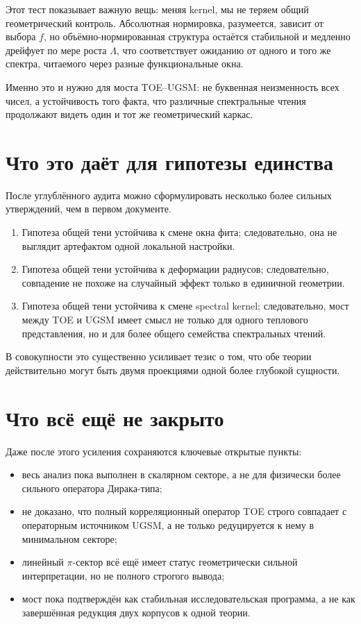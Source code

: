 \documentclass[12pt,a4paper]{article}
\begin{document}
Этот тест показывает важную вещь: меняя kernel, мы не теряем общий геометрический контроль. Абсолютная нормировка, разумеется, зависит от выбора \(f\), но объёмно-нормированная структура остаётся стабильной и медленно дрейфует по мере роста \(\Lambda\), что соответствует ожиданию от одного и того же спектра, читаемого через разные функциональные окна.

Именно это и нужно для моста TOE--UGSM: не буквенная неизменность всех чисел, а устойчивость того факта, что различные спектральные чтения продолжают видеть один и тот же геометрический каркас.

\section{Что это даёт для гипотезы единства}

После углублённого аудита можно сформулировать несколько более сильных утверждений, чем в первом документе.

\begin{enumerate}
    \item Гипотеза общей тени устойчива к смене окна фита; следовательно, она не выглядит артефактом одной локальной настройки.
    \item Гипотеза общей тени устойчива к деформации радиусов; следовательно, совпадение не похоже на случайный эффект только в единичной геометрии.
    \item Гипотеза общей тени устойчива к смене spectral kernel; следовательно, мост между TOE и UGSM имеет смысл не только для одного теплового представления, но и для более общего семейства спектральных чтений.
\end{enumerate}

В совокупности это существенно усиливает тезис о том, что обе теории действительно могут быть двумя проекциями одной более глубокой сущности.

\section{Что всё ещё не закрыто}

Даже после этого усиления сохраняются ключевые открытые пункты:
\begin{itemize}
    \item весь анализ пока выполнен в скалярном секторе, а не для физически более сильного оператора Дирака-типа;
    \item не доказано, что полный корреляционный оператор TOE строго совпадает с операторным источником UGSM, а не только редуцируется к нему в минимальном секторе;
    \item линейный \(\pi\)-сектор всё ещё имеет статус геометрически сильной интерпретации, но не полного строгого вывода;
    \item мост пока подтверждён как стабильная исследовательская программа, а не как завершённая редукция двух корпусов к одной теории.
\end{itemize}
\end{document}
